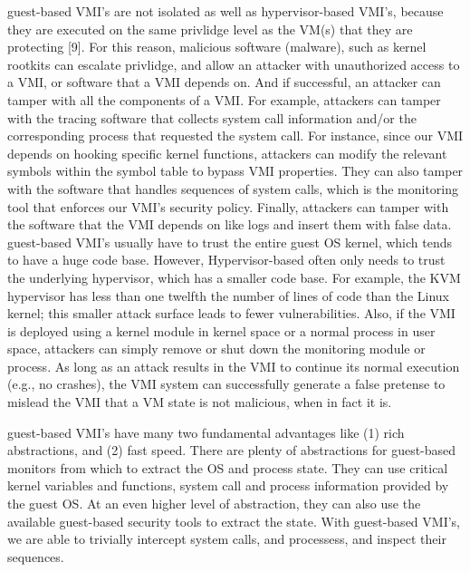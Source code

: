 \documentclass{report}
\begin{document}
\begin{spacing}{1.5}
{\large
guest-based VMI's are not isolated as well as hypervisor-based VMI's, because they are executed on the same privlidge level as the VM(s) that they are protecting [9]. For this reason, malicious software (malware), such as kernel rootkits can escalate privlidge, and allow an attacker with unauthorized access to a VMI, or software that a VMI depends on. And if successful, an attacker can tamper with all the components of a VMI. For example, attackers can tamper with the tracing software that collects system call information and/or the corresponding process that requested the system call. For instance, since our VMI depends on hooking specific kernel functions, attackers can modify the relevant symbols within the symbol table to bypass VMI properties. They can also tamper with the software that handles sequences of system calls, which is the monitoring tool that enforces our VMI's security policy. Finally, attackers can tamper with the software that the VMI depends on like logs and insert them with false data. guest-based VMI's usually have to trust the entire guest OS kernel, which tends to have a huge code base. However, Hypervisor-based often only needs to trust the underlying hypervisor, which has a smaller code base. For example, the KVM hypervisor has less than one twelfth the number of lines of code than the Linux kernel; this smaller attack surface leads to fewer vulnerabilities. Also, if the VMI is deployed using a kernel module in kernel space or a normal process in user space, attackers can simply remove or shut down the monitoring module or process. As long as an attack results in the VMI to continue its normal execution (e.g., no crashes), the VMI system can successfully generate a false pretense to mislead the VMI that a VM state is not malicious, when in fact it is.
\newline
}


{\large
guest-based VMI's have many two fundamental advantages like (1) rich abstractions, and (2) fast speed. There are plenty of abstractions for guest-based monitors from which to extract the OS and process state. They can use critical kernel variables and functions, system call and process information provided by the guest OS. At an even higher level of abstraction, they can also use the available guest-based security tools to extract the state. With guest-based VMI's, we are able to trivially intercept system calls, and processess, and inspect their sequences.
\newline
}




\end{spacing}
\end{document}
